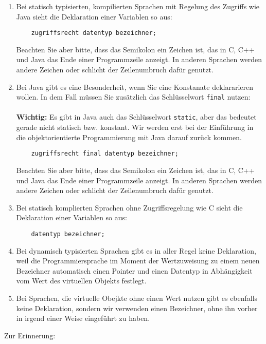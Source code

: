 \begin{enumerate}
	\item Bei statisch typisierten, kompilierten Sprachen mit Regelung des Zugriffs wie Java sieht die Deklaration einer Variablen so aus:
	\begin{verbatim}
	zugriffsrecht datentyp bezeichner;
	\end{verbatim}
	Beachten Sie aber bitte, dass das Semikolon ein Zeichen ist, das in C, C++ und Java das Ende einer Programmzeile anzeigt. In anderen Sprachen werden andere Zeichen oder schlicht der Zeilenumbruch dafür genutzt.
	\item Bei Java gibt es eine Besonderheit, wenn Sie eine Konstanate deklararieren wollen. In dem Fall müssen Sie zusätzlich das Schlüsselwort \verb|final| nutzen:\\
	\\
	\textbf{Wichtig:} Es gibt in Java auch das Schlüsselwort \verb|static|, aber das bedeutet gerade nicht statisch bzw. konstant. Wir werden erst bei der Einführung in die objektorientierte Programmierung mit Java darauf zurück kommen.
	\begin{verbatim}
	zugriffsrecht final datentyp bezeichner;
	\end{verbatim}
	Beachten Sie aber bitte, dass das Semikolon ein Zeichen ist, das in C, C++ und Java das Ende einer Programmzeile anzeigt. In anderen Sprachen werden andere Zeichen oder schlicht der Zeilenumbruch dafür genutzt.
	\item Bei statisch komplierten Sprachen ohne Zugriffsregelung wie C sieht die Deklaration einer Variablen so aus:
	\begin{verbatim}
	datentyp bezeichner;
	\end{verbatim}
	\item Bei dynamisch typisierten Sprachen gibt es in aller Regel keine Deklaration, weil die Programmiersprache im Moment der Wertzuweisung zu einem neuen Bezeichner automatisch einen Pointer und einen Datentyp in Abhängigkeit vom Wert des virtuellen Objekts festlegt.
	\item Bei Sprachen, die virtuelle Obejkte ohne einen Wert nutzen gibt es ebenfalls keine Deklaration, sondern wir verwenden einen Bezeichner, ohne ihn vorher in irgend einer Weise eingeführt zu haben.
\end{enumerate}

Zur Erinnerung:\\

